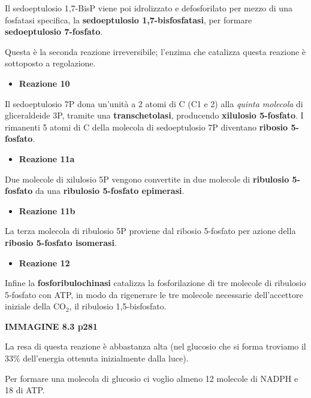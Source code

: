 \documentclass[]{article}
\begin{document}
Il sedoeptulosio 1,7-BisP viene poi idrolizzato e defosforilato per
mezzo di una fosfatasi specifica, la \textbf{sedoeptulosio
1,7-bisfosfatasi}, per formare \textbf{sedoeptulosio 7-fosfato}.

Questa è la seconda reazione irreversibile; l'enzima che catalizza
questa reazione è sottoposto a regolazione.

\begin{itemize}
\itemsep1pt\parskip0pt
\item
  \textbf{Reazione 10}
\end{itemize}

Il sedoeptulosio 7P dona un'unità a 2 atomi di C (C1 e 2) alla
\emph{quinta molecola} di gliceraldeide 3P, tramite una
\textbf{transchetolasi}, producendo \textbf{xilulosio 5-fosfato}. I
rimanenti 5 atomi di C della molecola di sedoeptulosio 7P diventano
\textbf{ribosio 5-fosfato}.

\begin{itemize}
\itemsep1pt\parskip0pt
\item
  \textbf{Reazione 11a}
\end{itemize}

Due molecole di xilulosio 5P vengono convertite in due molecole di
\textbf{ribulosio 5-fosfato} da una \textbf{ribulosio 5-fosfato
epimerasi}.

\begin{itemize}
\itemsep1pt\parskip0pt
\item
  \textbf{Reazione 11b}
\end{itemize}

La terza molecola di ribulosio 5P proviene dal ribosio 5-fosfato per
azione della \textbf{ribosio 5-fosfato isomerasi}.

\begin{itemize}
\itemsep1pt\parskip0pt
\item
  \textbf{Reazione 12}
\end{itemize}

Infine la \textbf{fosforibulochinasi} catalizza la fosforilazione di tre
molecole di ribulosio 5-fosfato con ATP, in modo da rigenerare le tre
molecole necessarie dell'accettore iniziale della CO$_2$, il ribulosio
1,5-bisfosfato.

\textbf{IMMAGINE 8.3 p281}

La resa di questa reazione è abbastanza alta (nel glucosio che si forma
troviamo il 33\% dell'energia ottenuta inizialmente dalla luce).

Per formare una molecola di glucosio ci voglio almeno 12 molecole di
NADPH e 18 di ATP.
\end{document}
